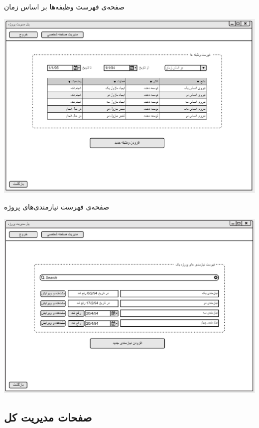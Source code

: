 \documentclass{article}
\begin{document}
\vspace{1cm}
صفحه‌ی فهرست وظیفه‌ها بر اساس زمان
\begin{center}
\includegraphics[width=\textwidth]{Prototype/ProjectManager/ProjectTasks2.png}
\end{center}

\newpage
\vspace{1cm}
صفحه‌ی فهرست نیازمندی‌های پروژه 
\begin{center}
\includegraphics[width=\textwidth]{Prototype/ProjectManager/ProjectRequirements.png}
\end{center}

\newpage
\subsection{صفحات مدیریت کل}
\end{document}

